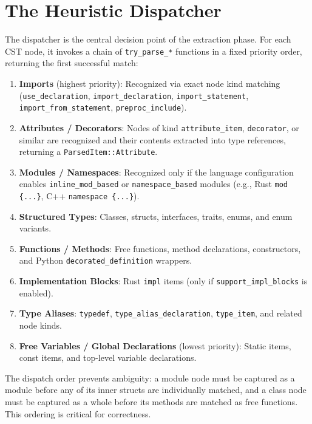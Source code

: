 \section{The Heuristic Dispatcher}
\label{sec:dispatcher}

The dispatcher is the central decision point of the extraction phase.
For each CST node, it invokes a chain of \texttt{try\_parse\_*}
functions in a fixed priority order, returning the first successful match:

\begin{enumerate}
  \item \textbf{Imports} (highest priority): Recognized via exact
    node kind matching (\texttt{use\_declaration},
      \texttt{import\_declaration}, \texttt{import\_statement},
    \texttt{import\_from\_statement}, \texttt{preproc\_include}).
  \item \textbf{Attributes / Decorators}: Nodes of kind
    \texttt{attribute\_item}, \texttt{decorator}, or similar are
    recognized and their contents extracted into type references,
    returning a \texttt{ParsedItem::Attribute}.
  \item \textbf{Modules / Namespaces}: Recognized only if the
    language configuration enables \texttt{inline\_mod\_based} or
    \texttt{namespace\_based} modules (e.g., Rust \texttt{mod
    \{...\}}, C++ \texttt{namespace \{...\}}).
  \item \textbf{Structured Types}: Classes, structs, interfaces,
    traits, enums, and enum variants.
  \item \textbf{Functions / Methods}: Free functions, method
    declarations, constructors, and Python
    \texttt{decorated\_definition} wrappers.
  \item \textbf{Implementation Blocks}: Rust \texttt{impl} items
    (only if \texttt{support\_impl\_blocks} is enabled).
  \item \textbf{Type Aliases}: \texttt{typedef},
    \texttt{type\_alias\_declaration}, \texttt{type\_item}, and
    related node kinds.
  \item \textbf{Free Variables / Global Declarations} (lowest
    priority): Static items, const items, and top-level variable declarations.
\end{enumerate}

The dispatch order prevents ambiguity: a module node must be captured
as a module before any of its inner structs are individually matched,
and a class node must be captured as a whole before its methods are
matched as free functions. This ordering is critical for correctness.

